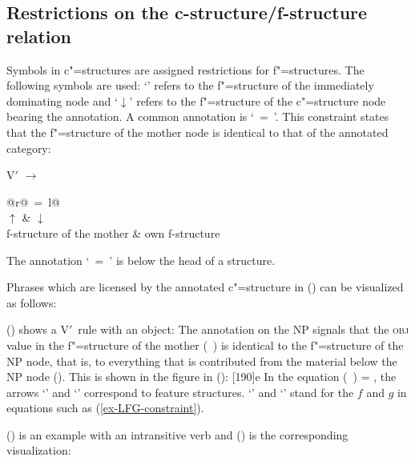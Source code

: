 \subsection{Restrictions on the c-structure/f-structure relation}

Symbols in c"=structures are assigned restrictions for f"=structures. The following symbols are used: `\up'\is{$\uparrow$} refers to the f"=structure of the
immediately dominating node and `$\downarrow$'\is{$\downarrow$} refers to the f"=structure of the c"=structure node bearing the annotation. A common annotation is
`\up~=~\down'. This constraint states that the f"=structure of the mother node is identical to that of the annotated category:

\ea
V$'$ $\to$ \begin{tabular}[t]{@{}r@{~=~}l@{}}
           \\
           $\uparrow$ &  $\downarrow$\\ 
           f-structure of the mother & own f-structure\\
           \end{tabular}
\z
The annotation `\up~=~\down' is below the head of a structure.

Phrases which are licensed by the annotated c"=structure in () can be visualized as follows:
\ea
{}%
\hspace*{3em}%
\z

\noindent
() shows a V$'$~rule with an object:
\ea
{}
\z
%
The annotation on the NP signals that the \textsc{obj} value in the f"=structure of the mother
\mbox{(\up\ \lfgobj)} is identical to the f"=structure of the NP node, that is, to everything that is
contributed from the material below the NP node (\down). 
This is shown in the figure in ():
\ea
{}%
\hspace*{3em}%
[190]{e}
\z
In the equation (\up\ \lfgobj) = \down{},  the arrows `\up' and `\down' correspond to feature structures. `\up' and
`\down' stand for the $f$ and $g$ in equations such as (\ref{ex-LFG-constraint}).

() is an example with an intransitive verb and () is the corresponding visualization:

